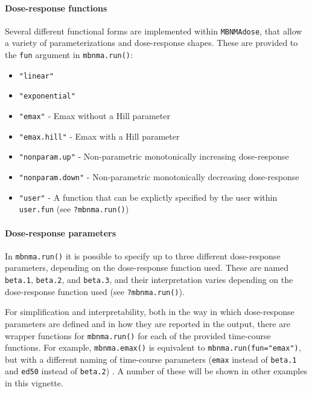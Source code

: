 \documentclass[]{article}
\providecommand{\tightlist}{%
  \setlength{\itemsep}{0pt}\setlength{\parskip}{0pt}}
\let\oldparagraph\paragraph
\renewcommand{\paragraph}[1]{\oldparagraph{#1}\mbox{}}
\begin{document}
\hypertarget{dose-response-functions}{%
\paragraph{Dose-response functions}\label{dose-response-functions}}

Several different functional forms are implemented within
\texttt{MBNMAdose}, that allow a variety of parameterizations and
dose-response shapes. These are provided to the \texttt{fun} argument in
\texttt{mbnma.run()}:

\begin{itemize}
\tightlist
\item
  \texttt{"linear"}
\item
  \texttt{"exponential"}
\item
  \texttt{"emax"} - Emax without a Hill parameter
\item
  \texttt{"emax.hill"} - Emax with a Hill parameter
\item
  \texttt{"nonparam.up"} - Non-parametric monotonically increasing
  dose-response
\item
  \texttt{"nonparam.down"} - Non-parametric monotonically decreasing
  dose-response
\item
  \texttt{"user"} - A function that can be explictly specified by the
  user within \texttt{user.fun} (see \texttt{?mbnma.run()})
\end{itemize}

\hypertarget{dose-response-parameters}{%
\paragraph{Dose-response parameters}\label{dose-response-parameters}}

In \texttt{mbnma.run()} it is possible to specify up to three different
dose-response parameters, depending on the dose-response function used.
These are named \texttt{beta.1}, \texttt{beta.2}, and \texttt{beta.3},
and their interpretation varies depending on the dose-response function
used (see \texttt{?mbnma.run()}).

For simplification and interpretability, both in the way in which
dose-response parameters are defined and in how they are reported in the
output, there are wrapper functions for \texttt{mbnma.run()} for each of
the provided time-course functions. For example, \texttt{mbnma.emax()}
is equivalent to \texttt{mbnma.run(fun="emax")}, but with a different
naming of time-course parameters (\texttt{emax} instead of
\texttt{beta.1} and \texttt{ed50} instead of \texttt{beta.2}) . A number
of these will be shown in other examples in this vignette.
\end{document}
